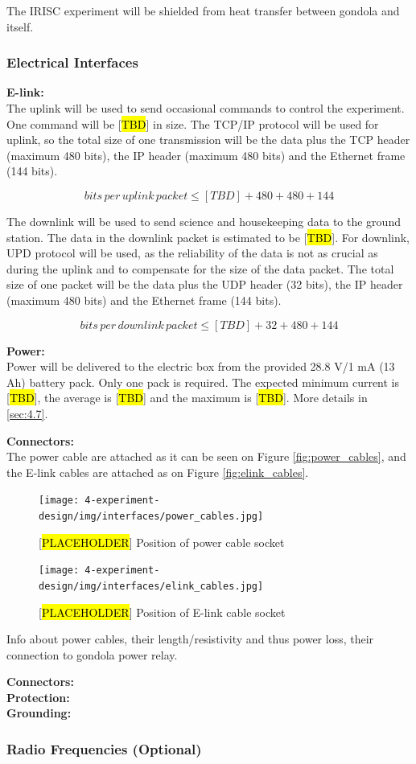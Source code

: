 The IRISC experiment will be shielded from heat transfer between gondola and itself.

\label{sec:4.2.2}


\subsubsection{Electrical Interfaces}
\label{sec:4.2.3}
\textbf{E-link:}\\
The uplink will be used to send occasional commands to control the experiment. One command will be [\hl{TBD}] in size. The TCP/IP protocol will be used for uplink, so the total size of one transmission will be the data plus the TCP header (maximum 480 bits), the IP header (maximum 480 bits) and the Ethernet frame (144 bits). 

$$ bits\, per\, uplink\, packet \leq [TBD] + 480 + 480 + 144 $$

The downlink will be used to send science and housekeeping data to the ground station. The data in the downlink packet is estimated to be [\hl{TBD}]. For downlink, UPD protocol will be used, as the reliability of the data is not as crucial as during the uplink and to compensate for the size of the data packet. The total size of one packet will be the data plus the UDP header (32 bits), the IP header (maximum 480 bits) and the Ethernet frame (144 bits).

$$ bits\, per\, downlink\, packet \leq [TBD] + 32 + 480 + 144 $$

\textbf{Power:}\\

Power will be delivered to the electric box from the provided 28.8 V/1 mA (13 Ah) battery pack. Only one pack is required. The expected minimum current is [\hl{TBD}], the average is [\hl{TBD}] and the maximum is [\hl{TBD}]. More details in \ref{sec:4.7}.

\textbf{Connectors:}\\
The power cable are attached as it can be seen on Figure \ref{fig:power_cables}, and the E-link cables are attached as on Figure \ref{fig:elink_cables}.

\begin{figure}[H]
    \centering
	\texttt{[image: 4-experiment-design/img/interfaces/power\_cables.jpg]}
	\caption{[\hl{PLACEHOLDER}] Position of power cable socket}
\end{figure}

\begin{figure}[H]
    \centering
	\texttt{[image: 4-experiment-design/img/interfaces/elink\_cables.jpg]}
	\caption{[\hl{PLACEHOLDER}] Position of E-link cable socket}
\end{figure}

Info about power cables, their length/resistivity and thus power loss, their connection to gondola power relay. 



\textbf{Connectors:}\\

\textbf{Protection:}\\

\textbf{Grounding:}\\


\subsubsection{Radio Frequencies (Optional)}



\raggedbottom